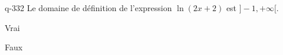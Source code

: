 \begin{truefalse}{q-332}
Le domaine de définition de l'expression $\ln(2x+2)$ est $]-1,+\infty[$.
\item* Vrai
\item Faux
\end{truefalse}

